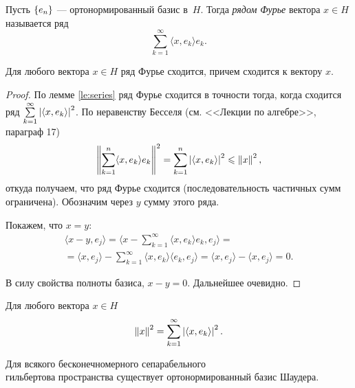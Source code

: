\begin{definition}
    Пусть $\left\{e_n\right\}$ --- ортонормированный базис в~$H$. Тогда \emph{рядом Фурье} вектора $x \in H$ называется ряд 
    \[ \sum\limits_{k=1}^\infty \langle x, e_k \rangle e_k. \]
\end{definition}

\begin{theorem}\label{th:fourier}
    Для любого вектора $x\in H$ ряд Фурье сходится, причем сходится к вектору $x$.
\end{theorem}

\begin{proof}
    По лемме \ref{le:series} ряд Фурье сходится в точности тогда, когда сходится ряд
    $\sum\limits_{k=1}^\infty \left|\langle x, e_k \rangle\right|^2$. По неравенству Бесселя (см. <<Лекции по алгебре>>, параграф 17)
    \[ \left\|\sum_{k=1}^n \langle x, e_k \rangle e_k\right\|^2 = \sum_{k=1}^n \left|\langle x, e_k \rangle\right|^2 \leqslant \left\|x\right\|^2, \]
    откуда получаем, что ряд Фурье сходится (последовательность частичных сумм ограничена).
    Обозначим через $y$ сумму этого ряда.

    Покажем, что $x = y$:
    \begin{multline*}
         \langle x - y, e_j \rangle = 
            \langle x - \sum_{k=1}^\infty \langle x, e_k \rangle e_k, e_j \rangle = \\ =
            \langle x, e_j \rangle - \sum_{k=1}^\infty \langle x, e_k \rangle 
                \langle e_k, e_j \rangle =
                \langle x, e_j \rangle - \langle x, e_j \rangle = 0.
    \end{multline*}

    В силу свойства полноты базиса, $x - y = 0$. Дальнейшее очевидно.
\end{proof}

\begin{corollaryth}
    Для любого вектора $x\in H$
    \[ \left\|x\right\|^2 = \sum_{k=1}^\infty \left|\langle x, e_k \rangle\right|^2. \]
\end{corollaryth}

\begin{theorem}\label{th:basis}
    Для всякого бесконечномерного сепарабельного\\гильбертова пространства существует 
    ортонормированный базис Шаудера.
\end{theorem}

